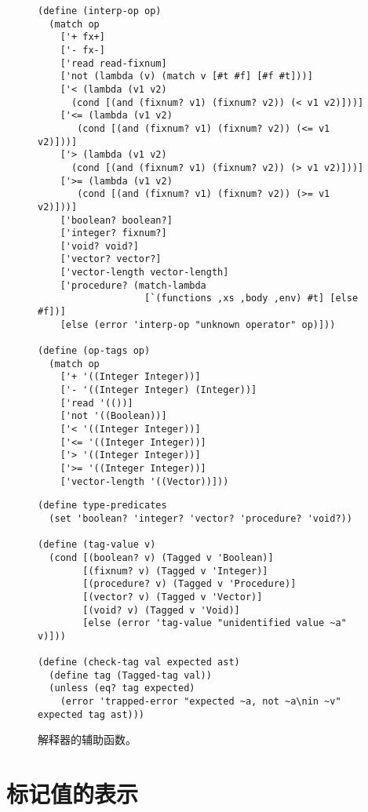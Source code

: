 \documentclass[11pt]{book}
\begin{document}
\begin{figure}[tbp]
\begin{lstlisting}
(define (interp-op op)
  (match op
    ['+ fx+]
    ['- fx-]
    ['read read-fixnum]
    ['not (lambda (v) (match v [#t #f] [#f #t]))]
    ['< (lambda (v1 v2)
	  (cond [(and (fixnum? v1) (fixnum? v2)) (< v1 v2)]))]
    ['<= (lambda (v1 v2)
	   (cond [(and (fixnum? v1) (fixnum? v2)) (<= v1 v2)]))]
    ['> (lambda (v1 v2)
	  (cond [(and (fixnum? v1) (fixnum? v2)) (> v1 v2)]))]
    ['>= (lambda (v1 v2)
	   (cond [(and (fixnum? v1) (fixnum? v2)) (>= v1 v2)]))]
    ['boolean? boolean?]
    ['integer? fixnum?]
    ['void? void?]
    ['vector? vector?]
    ['vector-length vector-length]
    ['procedure? (match-lambda
                   [`(functions ,xs ,body ,env) #t] [else #f])]
    [else (error 'interp-op "unknown operator" op)]))

(define (op-tags op)
  (match op
    ['+ '((Integer Integer))]
    ['- '((Integer Integer) (Integer))]
    ['read '(())]
    ['not '((Boolean))]
    ['< '((Integer Integer))]
    ['<= '((Integer Integer))]
    ['> '((Integer Integer))]
    ['>= '((Integer Integer))]
    ['vector-length '((Vector))]))
\end{lstlisting}
\end{figure}
\begin{figure}[tbp]
\begin{lstlisting}
(define type-predicates
  (set 'boolean? 'integer? 'vector? 'procedure? 'void?))

(define (tag-value v)
  (cond [(boolean? v) (Tagged v 'Boolean)]
        [(fixnum? v) (Tagged v 'Integer)]
        [(procedure? v) (Tagged v 'Procedure)]
        [(vector? v) (Tagged v 'Vector)]
        [(void? v) (Tagged v 'Void)]
        [else (error 'tag-value "unidentified value ~a" v)]))

(define (check-tag val expected ast)
  (define tag (Tagged-tag val))
  (unless (eq? tag expected)
    (error 'trapped-error "expected ~a, not ~a\nin ~v" expected tag ast)))
\end{lstlisting}
\caption{ \LangDyn{} 解释器的辅助函数。}
\label{fig:interp-Rdyn-aux}
\end{figure}

\clearpage

\section{标记值的表示}
\end{document}
